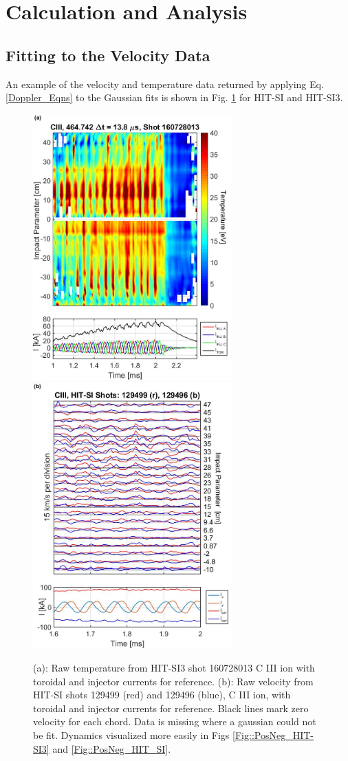	\section{Calculation and Analysis}\label{sec::Analysis}
	\subsection{Fitting to the Velocity Data}\label{sec::DataFit}
	\hspace{4ex}An example of the velocity and temperature data returned by applying Eq. \ref{Doppler_Eqns} to the Gaussian fits is shown in Fig. \ref{Fig::Raw_VelTemp} for HIT-SI and HIT-SI3.
	\begin{figure}
		\includegraphics[width=3in]{160728013_Temp_1}\nolinebreak
		\includegraphics[width=3in]{129499_Lines_5}\caption{(a): Raw temperature from HIT-SI3 shot 160728013 C III ion with toroidal and injector currents for reference. (b): Raw velocity from HIT-SI shots 129499 (red) and 129496 (blue), C III ion, with toroidal and injector currents for reference. Black lines mark zero velocity for each chord. Data is missing where a gaussian could not be fit. Dynamics visualized more easily in Figs \ref{Fig::PosNeg_HIT-SI3} and \ref{Fig::PosNeg_HIT_SI}. }\label{Fig::Raw_VelTemp}
	\end{figure}
